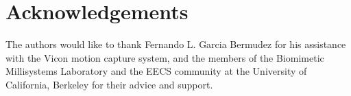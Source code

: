 \documentclass[letterpaper, 10 pt, conference]{ieeeconf}
\begin{document}
\section{Acknowledgements}
The authors would like to thank Fernando L. Garcia Bermudez for his assistance with the Vicon motion capture system, and the members of the Biomimetic Millisystems Laboratory and the EECS community at the University of California, Berkeley for their advice and support.


\end{document}
